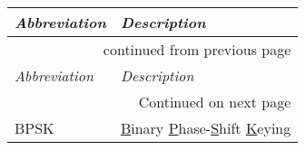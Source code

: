 



\vspace{0mm}
    \setlength\LTleft{0pt}
    \setlength\LTright{0pt}

\begin{longtable}{l @{\extracolsep\fill} p{} }
\toprule
{\itshape Abbreviation} & {\itshape Description} \\
\hline \hline
\endfirsthead
\hline \multicolumn{2}{r}{{continued from previous page}} \\ \hline
{\itshape Abbreviation} & {\itshape Description} \\
\hline
\endhead
\hline \multicolumn{2}{r}{{Continued on next page}} \\ \hline
\endfoot
\hline \hline
\endlastfoot


BPSK & \ul{B}inary \ul{P}hase-\ul{S}hift \ul{K}eying \\

\end{longtable}

